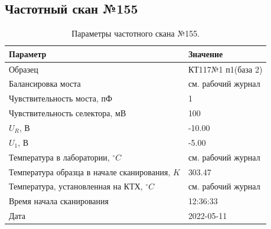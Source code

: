 \subsection{Частотный скан №155}
\begin{table}[!ht]
    \centering
    \caption{Параметры частотного скана №155.}
    \begin{tabular}{|l|l|}
        \hline
        Параметр                                       & Значение                  \\ \hline
        Образец                                        & КТ117№1 п1(база 2)        \\ \hline
        Балансировка моста                             & см. рабочий журнал        \\ \hline
        Чувствительность моста, пФ                     & 1                         \\ \hline
        Чувствительность селектора, мВ                 & 100                       \\ \hline
        $U_R$, В                                       & -10.00                    \\ \hline
        $U_1$, В                                       & -5.00                     \\ \hline
        Температура в лаборатории, $^\circ C$          & см. рабочий журнал        \\ \hline
        Температура образца в начале сканирования, $K$ & 303.47                    \\ \hline
        Температура, установленная на КТХ, $^\circ C$  & см. рабочий журнал        \\ \hline
        Время начала сканирования                      & 12:36:33                  \\ \hline
        Дата                                           & 2022-05-11                \\ \hline
    \end{tabular}
    \label{table:frequency_scan_155}
\end{table}

